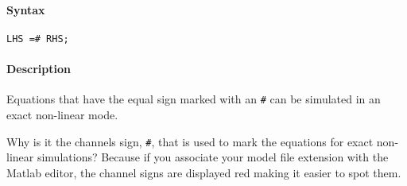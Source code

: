 


	\paragraph{Syntax}

\begin{verbatim}
LHS =# RHS;
\end{verbatim}

\paragraph{Description}

Equations that have the equal sign marked with an \texttt{\#} can be
simulated in an exact non-linear mode.

Why is it the channels sign, \texttt{\#}, that is used to mark the
equations for exact non-linear simulations? Because if you associate
your model file extension with the Matlab editor, the channel signs are
displayed red making it easier to spot them.


